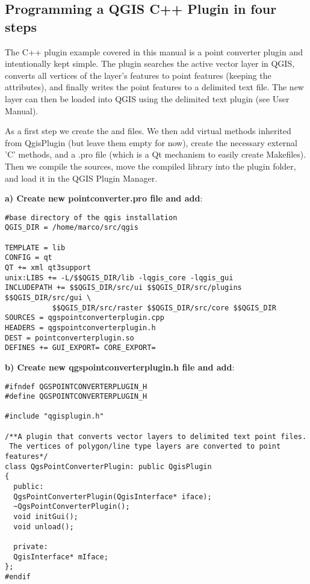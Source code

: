 \subsection{Programming a QGIS C++ Plugin in four steps}

The C++ plugin example covered in this manual is a point converter plugin and intentionally kept simple. 
The plugin searches the active vector layer in QGIS, converts all vertices of 
the layer's features to point features (keeping the attributes), and finally
writes the point features to a delimited text file. The new layer can then
be loaded into QGIS using the delimited text plugin (see User Manual).


As a first step we create the  and
 files. We then add virtual methods inherited
from QgisPlugin (but leave them empty for now), create the necessary external 'C'
methods, and a .pro file (which is a Qt mechanism to easily create Makefiles).
Then we compile the sources, move the compiled library into the plugin folder,
and load it in the QGIS Plugin Manager.

\textbf{a) Create new pointconverter.pro file and add}:


% 
%
%
%


\begin{verbatim}
#base directory of the qgis installation
QGIS_DIR = /home/marco/src/qgis

TEMPLATE = lib
CONFIG = qt
QT += xml qt3support
unix:LIBS += -L/$$QGIS_DIR/lib -lqgis_core -lqgis_gui
INCLUDEPATH += $$QGIS_DIR/src/ui $$QGIS_DIR/src/plugins  $$QGIS_DIR/src/gui \
	       $$QGIS_DIR/src/raster $$QGIS_DIR/src/core $$QGIS_DIR 
SOURCES = qgspointconverterplugin.cpp
HEADERS = qgspointconverterplugin.h
DEST = pointconverterplugin.so
DEFINES += GUI_EXPORT= CORE_EXPORT=
\end{verbatim}

\textbf{b) Create new qgspointconverterplugin.h file and add}:

\begin{verbatim}
#ifndef QGSPOINTCONVERTERPLUGIN_H
#define QGSPOINTCONVERTERPLUGIN_H

#include "qgisplugin.h"

/**A plugin that converts vector layers to delimited text point files.
 The vertices of polygon/line type layers are converted to point features*/
class QgsPointConverterPlugin: public QgisPlugin
{
  public:
  QgsPointConverterPlugin(QgisInterface* iface);
  ~QgsPointConverterPlugin();
  void initGui();
  void unload();
  
  private:
  QgisInterface* mIface;
};
#endif
\end{verbatim}

